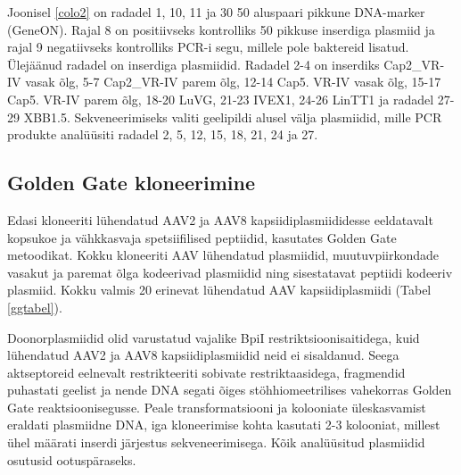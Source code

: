 \documentclass{trkut}%
\begin{document}
Joonisel \ref{colo2} on radadel 1, 10, 11 ja 30 50 aluspaari pikkune DNA-marker (GeneON). Rajal 8 on positiivseks kontrolliks \SI{50}{\basepair} pikkuse inserdiga plasmiid ja rajal 9 negatiivseks kontrolliks PCR-i segu, millele pole baktereid lisatud. Ülejäänud radadel on inserdiga plasmiidid. Radadel 2-4 on inserdiks Cap2\_VR-IV vasak õlg, 5-7 Cap2\_VR-IV parem õlg, 12-14 Cap5. VR-IV vasak õlg, 15-17 Cap5. VR-IV parem õlg, 18-20 LuVG, 21-23 IVEX1, 24-26 LinTT1 ja radadel 27-29 XBB1.5. Sekveneerimiseks valiti geelipildi alusel välja plasmiidid, mille PCR produkte analüüsiti radadel 2, 5, 12, 15, 18, 21, 24 ja 27.

\subsection{Golden Gate kloneerimine}

Edasi kloneeriti lühendatud AAV2 ja AAV8 kapsiidiplasmiididesse eeldatavalt kopsukoe ja vähkkasvaja spetsiifilised peptiidid, kasutates Golden Gate metoodikat. Kokku kloneeriti AAV lühendatud plasmiidid, muutuvpiirkondade vasakut ja paremat õlga kodeerivad plasmiidid ning sisestatavat peptiidi kodeeriv plasmiid. Kokku valmis 20 erinevat lühendatud AAV kapsiidiplasmiidi (Tabel \ref{ggtabel}).

Doonorplasmiidid olid varustatud vajalike BpiI restriktsioonisaitidega, kuid lühendatud AAV2 ja AAV8 kapsiidiplasmiidid neid ei sisaldanud. Seega aktseptoreid eelnevalt restrikteeriti sobivate restriktaasidega, fragmendid puhastati geelist ja nende DNA segati õiges stöhhiomeetrilises vahekorras Golden Gate reaktsioonisegusse. Peale transformatsiooni ja kolooniate üleskasvamist eraldati plasmiidne DNA, iga kloneerimise kohta kasutati 2-3 kolooniat, millest ühel määrati inserdi järjestus sekveneerimisega. Kõik analüüsitud plasmiidid osutusid ootuspäraseks.
\end{document}
